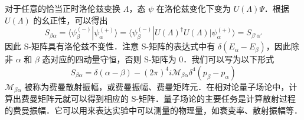 对于任意的恰当正时洛伦兹变换 $\Lambda$，态 $\psi$ 在洛伦兹变化下变为 $U(\Lambda)\Psi$．根据 $U(\Lambda)$ 的幺正性，可以得出
\begin{equation}
S_{\beta\alpha}=\langle \psi_\beta^{(-)}| \psi_\alpha^{(+)} \rangle=\langle \psi_\beta^{(-)}| U(\Lambda)^\dagger U(\Lambda) |\psi_\alpha^{(+)} \rangle=S_{\beta'\alpha'}
\end{equation}
因此 S-矩阵具有洛伦兹不变性．注意 S-矩阵的表达式中有 $\delta(E_\alpha-E_\beta)$，因此除非 $\alpha$ 和 $\beta$ 态对应的四动量守恒，否则 S-矩阵为 $0$．我们可以写为以下形式
\begin{equation}
S_{\beta\alpha}=\delta(\alpha-\beta)-(2\pi)^4 i \mathcal{M}_{\beta\alpha}\delta^4(p_\beta-p_\alpha)
\end{equation}
$\mathcal{M}_{\beta\alpha}$ 被称为费曼散射振幅，或费曼振幅、费曼矩阵元．在相对论量子场论中，计算出费曼矩阵元就可以得到相应的 S-矩阵．量子场论的主要任务是计算散射过程的费曼振幅．它可以用来表达实验中可以测量的物理量，如衰变率、散射振幅等．
